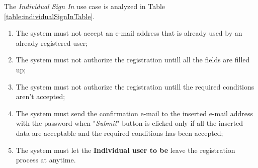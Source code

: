 The \textit{Individual Sign In} use case is analyzed in Table \ref{table:individualSignInTable}.

\begin{enumerate}
  \item The system must not accept an e-mail address that is already used by an already registered user;
  \item The system must not authorize the registration untill all the fields are filled up;
  \item The system must not authorize the registration untill the required conditions aren't accepted;
  \item The system must send the confirmation e-mail to the inserted e-mail address with the password when "\textit{Submit}" button is clicked only if all the inserted data are acceptable and the required conditions has been accepted;
  \item The system must let the \textbf{Individual user to be} leave the registration process at anytime.
\end{enumerate}

